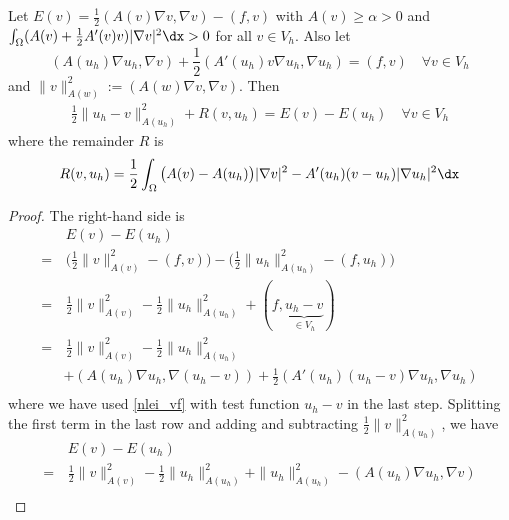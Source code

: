 \documentclass[12pt]{article}
\begin{document}
\begin{lem}\label{lem:nonlinenergyident}
Let $E(v) = \frac{1}{2}(A(v) \nabla v,\nabla v) - (f, v)$ with $A(v) \geq \alpha > 0$ and $\int_{\Omega} (A(v) + \frac{1}{2}A'(v)v) |\nabla v|^2 \dx > 0$ for all $v \in V_h$. Also let
\begin{equation}
(A(u_h) \nabla u_h, \nabla v) + \frac{1}{2}(A'(u_h)v \nabla u_h, \nabla u_h) = (f, v) \quad \forall v \in V_h \label{nlei_vf}
\end{equation}
and $\| v \|_{A(w)}^2 := (A(w) \nabla v, \nabla v)$. Then
	\begin{align}
	\boxed{
		\frac{1}{2}\| u_h - v \|_{A(u_h)}^2 + R(v, u_h) = E(v) - E(u_{h}) \quad \forall v \in V_h \label{nlei_mainres}
		}
	\end{align}
	where the remainder $R$ is
	\begin{align}
	R(v, u_h) = \frac{1}{2} \int_{\Omega} \big(A(v) - A(u_h)\big) | \nabla v |^2 - A'(u_h) (v - u_h) | \nabla u_h |^2 \dx \label{nlei_remainder}
	\end{align}
	\begin{proof}
		The right-hand side is
		\begin{equation}
		\begin{aligned}
			& \, E(v) - E(u_{h}) \\
			= & \, \bigg( \frac{1}{2}\| v \|_{A(v)}^2 - (f,v) \bigg) - \bigg( \frac{1}{2}\| u_h \|_{A(u_h)}^2 - (f,u_h) \bigg) \\
			= & \, \frac{1}{2}\| v \|_{A(v)}^2 - \frac{1}{2}\| u_h \|_{A(u_h)}^2 + (f,\underbrace{u_h - v}_{\in V_h}) \\
			= & \, \frac{1}{2}\| v \|_{A(v)}^2 - \frac{1}{2}\| u_h \|_{A(u_h)}^2 \\
			& + (A(u_h) \nabla u_h, \nabla (u_h - v)) + \frac{1}{2}(A'(u_h) (u_h - v) \nabla u_h, \nabla u_h) \\
		\end{aligned}
		\end{equation}
		where we have used \eqref{nlei_vf} with test function $u_h - v$ in the last step. Splitting the first term in the last row and adding and subtracting $\frac{1}{2}\| v \|_{A(u_h)}^2$, we have
		\begin{equation}
		\begin{aligned}
			& \, E(v) - E(u_{h}) \\
			= & \, \frac{1}{2}\| v \|_{A(v)}^2 - \frac{1}{2}\| u_h \|_{A(u_h)}^2 + \| u_h \|_{A(u_h)}^2 - (A(u_h) \nabla u_h, \nabla v) \\

\end{aligned}
\end{equation}
\end{proof}
\end{lem}
\end{document}
